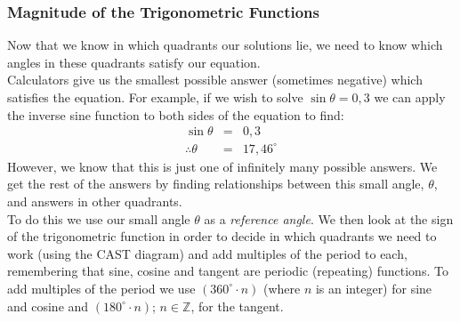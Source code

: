 \subsubsection{Magnitude of the Trigonometric Functions}
Now that we know in which quadrants our solutions lie, we need to know which angles in these quadrants satisfy our equation.\\
Calculators give us the smallest possible answer (sometimes negative) which satisfies the equation. For example, if we wish to solve $\sin\theta=0,3$ we can apply the inverse sine function to both sides of the equation to find:
\begin{eqnarray*}
\sin\theta&=&0,3\\
\therefore \theta&=& 17,46^\circ
\end{eqnarray*}
However, we know that this is just one of infinitely many possible answers. We get the rest of the answers by finding relationships between this small angle, $\theta$, and answers in other quadrants.\\
To do this we use our small angle $\theta$ as a \emph{reference angle}. We then look at the sign of the trigonometric function in order to decide in which quadrants we need to work (using the CAST diagram) and add multiples of the period to each, remembering that sine, cosine and tangent are periodic (repeating) functions. To add multiples of the period we use $(360^{\circ}\cdot n)$ (where $n$ is an integer) for sine and cosine and $(180^{\circ}\cdot n)$; $n \in \mathbb{Z}$, for the tangent. \\

